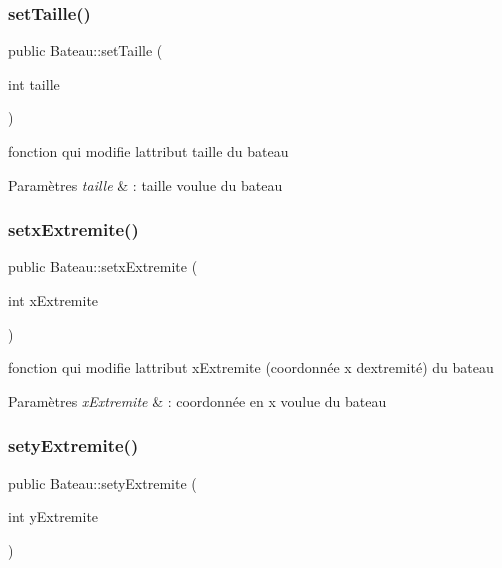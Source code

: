 \subsubsection{\texorpdfstring{set\+Taille()}{setTaille()}}
{\footnotesize\ttfamily public Bateau\+::set\+Taille (\begin{DoxyParamCaption}\item[{int}]{taille }\end{DoxyParamCaption})}



fonction qui modifie l\textquotesingle{}attribut taille du bateau 


\begin{DoxyParams}{Paramètres}
{\em taille} & \+: taille voulue du bateau \\
\hline
\end{DoxyParams}
\mbox{\label{class_bateau_aecf45729913eb0c51a82475b996273ce}} 
\subsubsection{\texorpdfstring{setx\+Extremite()}{setxExtremite()}}
{\footnotesize\ttfamily public Bateau\+::setx\+Extremite (\begin{DoxyParamCaption}\item[{int}]{x\+Extremite }\end{DoxyParamCaption})}



fonction qui modifie l\textquotesingle{}attribut x\+Extremite (coordonnée x d\textquotesingle{}extremité) du bateau 


\begin{DoxyParams}{Paramètres}
{\em x\+Extremite} & \+: coordonnée en x voulue du bateau \\
\hline
\end{DoxyParams}
\mbox{\label{class_bateau_a7fa9258d53309fcf41de04199d702fe7}} 
\subsubsection{\texorpdfstring{sety\+Extremite()}{setyExtremite()}}
{\footnotesize\ttfamily public Bateau\+::sety\+Extremite (\begin{DoxyParamCaption}\item[{int}]{y\+Extremite }\end{DoxyParamCaption})}



